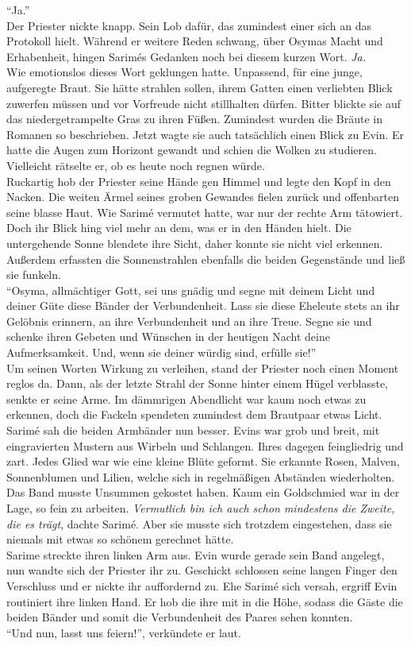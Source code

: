 ``Ja.''\\
Der Priester nickte knapp. Sein Lob dafür, das zumindest einer sich an das Protokoll hielt. Während 
er weitere Reden schwang, über Osymas Macht und Erhabenheit, hingen Sarimés Gedanken noch bei 
diesem kurzen Wort. \textit{Ja.}\\
Wie emotionslos dieses Wort geklungen hatte. Unpassend, für eine junge, aufgeregte Braut. Sie hätte 
strahlen sollen, ihrem Gatten einen verliebten Blick zuwerfen müssen und vor Vorfreude nicht 
stillhalten dürfen. Bitter blickte sie auf das niedergetrampelte Gras zu ihren Füßen. Zumindest 
wurden die Bräute in Romanen so beschrieben. Jetzt wagte sie auch tatsächlich einen Blick zu Evin. 
Er hatte die Augen zum Horizont gewandt und schien die Wolken zu studieren. Vielleicht rätselte er, 
ob es heute noch regnen würde.\\
Ruckartig hob der Priester seine Hände gen Himmel und legte den Kopf in den Nacken. Die weiten 
Ärmel seines groben Gewandes fielen zurück und offenbarten seine blasse Haut. Wie Sarimé vermutet 
hatte, war nur der rechte Arm tätowiert. Doch ihr Blick hing viel mehr an dem, was er in den Händen 
hielt. Die untergehende Sonne blendete ihre Sicht, daher konnte sie nicht viel erkennen. Außerdem 
erfassten die Sonnenstrahlen ebenfalls die beiden Gegenstände und ließ sie funkeln. \\
``Osyma, allmächtiger Gott, sei uns gnädig und segne mit deinem Licht und deiner Güte diese Bänder 
der Verbundenheit. Lass sie diese Eheleute stets an ihr Gelöbnis erinnern, an ihre Verbundenheit 
und an ihre Treue. Segne sie und schenke ihren Gebeten und Wünschen in der heutigen Nacht deine 
Aufmerksamkeit. Und, wenn sie deiner würdig sind, erfülle sie!''\\
Um seinen Worten Wirkung zu verleihen, stand der Priester noch einen Moment reglos da. Dann, als 
der letzte Strahl der Sonne hinter einem Hügel verblasste, senkte er seine Arme. Im dämmrigen 
Abendlicht war kaum noch etwas zu erkennen, doch die Fackeln spendeten zumindest dem Brautpaar 
etwas Licht. Sarimé sah die beiden Armbänder nun besser. Evins war grob und breit, mit 
eingravierten Mustern aus Wirbeln und Schlangen. Ihres dagegen feingliedrig und zart. Jedes Glied 
war wie eine kleine Blüte geformt. Sie erkannte Rosen, Malven, Sonnenblumen und Lilien, welche sich 
in regelmäßigen Abständen wiederholten. Das Band musste Unsummen gekostet haben. Kaum ein 
Goldschmied war in der Lage, so fein zu arbeiten. \textit{Vermutlich bin ich auch schon mindestens 
die Zweite, die es trägt}, dachte Sarimé. Aber sie musste sich trotzdem eingestehen, dass sie 
niemals mit etwas so schönem gerechnet hätte.\\
Sarime streckte ihren linken Arm aus. Evin wurde gerade sein Band angelegt, nun wandte sich der 
Priester ihr zu. Geschickt schlossen seine langen Finger den Verschluss und er nickte ihr 
auffordernd zu. Ehe Sarimé sich versah, ergriff Evin routiniert ihre linken Hand. Er hob die ihre 
mit in die Höhe, sodass die Gäste die beiden Bänder und somit die Verbundenheit des Paares sehen 
konnten.\\
``Und nun, lasst uns feiern!'', verkündete er laut.\\



